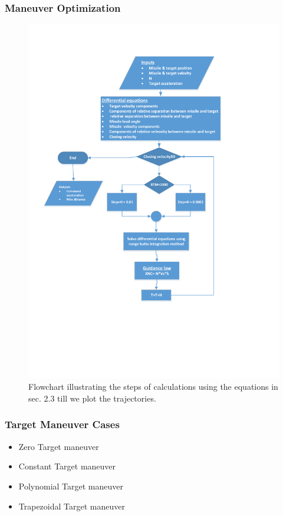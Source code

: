 \documentclass{beamer}
\begin{document}
\begin{frame}
\frametitle{Maneuver Optimization}
\begin{figure}[H]
	\centering
	\includegraphics[scale = 0.3]{fig/FlowchartPN.pdf}
	\caption{Flowchart illustrating the steps of calculations using the equations in sec. 2.3  till we plot the trajectories.}
	\label{flowchart PN}
\end{figure}
\end{frame}
\begin{frame}
\frametitle{Target Maneuver Cases}
\begin{itemize}
	\item Zero Target maneuver
	\item Constant Target maneuver
	\item Polynomial Target maneuver
	\item Trapezoidal Target maneuver
\end{itemize}
\end{frame}
\end{document}

